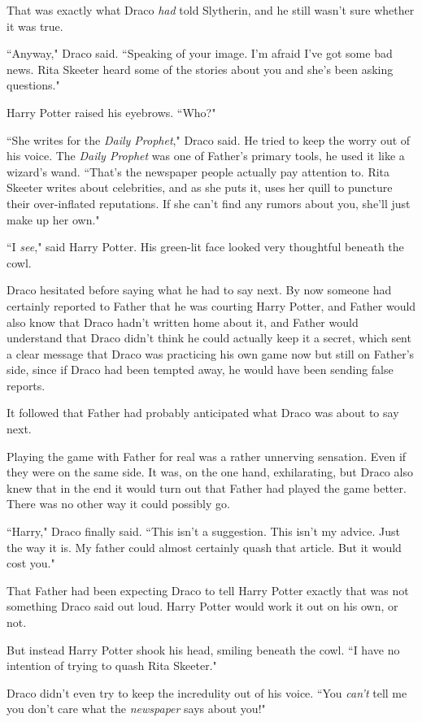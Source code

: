 That was exactly what Draco \emph{had} told Slytherin, and he still wasn't sure whether it was true.

``Anyway," Draco said. ``Speaking of your image. I'm afraid I've got some bad news. Rita Skeeter heard some of the stories about you and she's been asking questions."

Harry Potter raised his eyebrows. ``Who?"

``She writes for the \emph{Daily Prophet}," Draco said. He tried to keep the worry out of his voice. The \emph{Daily Prophet} was one of Father's primary tools, he used it like a wizard's wand. ``That's the newspaper people actually pay attention to. Rita Skeeter writes about celebrities, and as she puts it, uses her quill to puncture their over-inflated reputations. If she can't find any rumors about you, she'll just make up her own."

``I \emph{see}," said Harry Potter. His green-lit face looked very thoughtful beneath the cowl.

Draco hesitated before saying what he had to say next. By now someone had certainly reported to Father that he was courting Harry Potter, and Father would also know that Draco hadn't written home about it, and Father would understand that Draco didn't think he could actually keep it a secret, which sent a clear message that Draco was practicing his own game now but still on Father's side, since if Draco had been tempted away, he would have been sending false reports.

It followed that Father had probably anticipated what Draco was about to say next.

Playing the game with Father for real was a rather unnerving sensation. Even if they were on the same side. It was, on the one hand, exhilarating, but Draco also knew that in the end it would turn out that Father had played the game better. There was no other way it could possibly go.

``Harry," Draco finally said. ``This isn't a suggestion. This isn't my advice. Just the way it is. My father could almost certainly quash that article. But it would cost you."

That Father had been expecting Draco to tell Harry Potter exactly that was not something Draco said out loud. Harry Potter would work it out on his own, or not.

But instead Harry Potter shook his head, smiling beneath the cowl. ``I have no intention of trying to quash Rita Skeeter."

Draco didn't even try to keep the incredulity out of his voice. ``You \emph{can't} tell me you don't care what the \emph{newspaper} says about you!"

